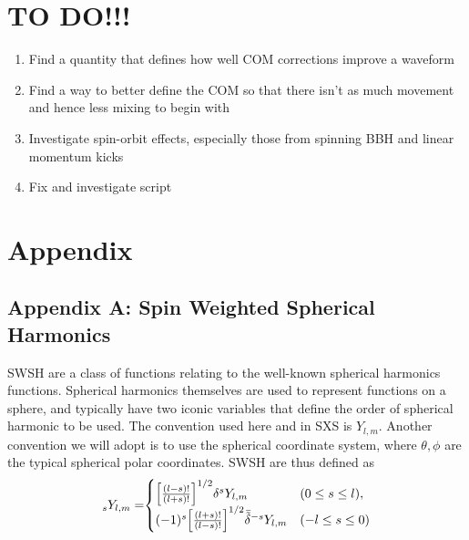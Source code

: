 \documentclass{article}
\begin{document}
\section{TO DO!!!}

\begin{enumerate}
\item{Find a quantity that defines how well COM corrections improve a waveform}
\item{Find a way to better define the COM so that there isn't as much movement and hence less mixing to begin with}
\item{Investigate spin-orbit effects, especially those from spinning BBH and linear momentum kicks}
\item{Fix and investigate script}
\end{enumerate}





\section{Appendix}
\subsection{Appendix A: Spin Weighted Spherical Harmonics}

SWSH are a class of functions relating to the well-known spherical harmonics functions. Spherical harmonics themselves are used to represent functions on a sphere, and typically have two iconic variables that define the order of spherical harmonic to be used. The convention used here and in SXS is $Y_{l,m}$. Another convention we will adopt is to use the spherical coordinate system, where $\theta, \phi$ are the typical spherical polar coordinates. SWSH are thus defined \cite{ENRP66} as 
\center
 \[$$_sY_{l,m}=$$ \begin{cases}
	\Big[ \frac{(l-s)!}{(l+s)!}\Big]^{1/2}\delta^s Y_{l,m} & (0 \leq s \leq l), \\
	(-1)^s \Big[\frac{(l+s)!}{(l-s)!}\Big]^{1/2} \bar{\tilde{\delta}}^{-s} Y_{l,m} & (-l \leq s \leq 0)
	\end{cases}
	\]
\end{document}
